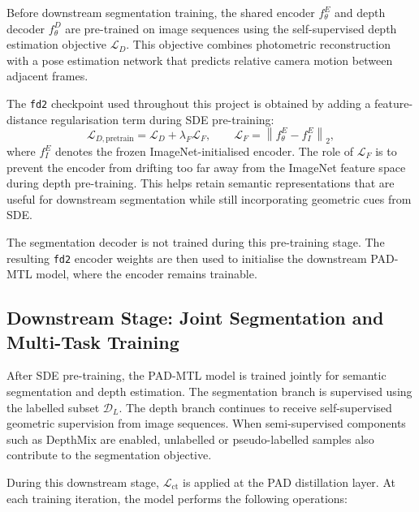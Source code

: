 Before downstream segmentation training, the shared encoder $f_\theta^E$
and depth decoder $f_\theta^D$ are pre-trained on image sequences using
the self-supervised depth estimation objective $\mathcal{L}_D$. This
objective combines photometric reconstruction with a pose estimation
network that predicts relative camera motion between adjacent frames.

The \texttt{fd2} checkpoint used throughout this project is obtained by
adding a feature-distance regularisation term during SDE pre-training:
\begin{equation}
    \mathcal{L}_{D,\text{pretrain}}
    =
    \mathcal{L}_D
    +
    \lambda_F \mathcal{L}_F,
    \qquad
    \mathcal{L}_F
    =
    \left\|
    f_\theta^E - f_I^E
    \right\|_2,
    \label{eq:pretrain-loss}
\end{equation}
where $f_I^E$ denotes the frozen ImageNet-initialised encoder. The role of
$\mathcal{L}_F$ is to prevent the encoder from drifting too far away from
the ImageNet feature space during depth pre-training. This helps retain
semantic representations that are useful for downstream segmentation while
still incorporating geometric cues from SDE.

The segmentation decoder is not trained during this pre-training stage.
The resulting \texttt{fd2} encoder weights are then used to initialise the
downstream PAD-MTL model, where the encoder remains trainable.

\subsection{Downstream Stage: Joint Segmentation and Multi-Task Training}
\label{sec:downstream-stage}

After SDE pre-training, the PAD-MTL model is trained jointly for semantic
segmentation and depth estimation. The segmentation branch is supervised
using the labelled subset $\mathcal{D}_L$. The depth branch continues to
receive self-supervised geometric supervision from image sequences.
When semi-supervised components such as DepthMix are enabled, unlabelled
or pseudo-labelled samples also contribute to the segmentation objective.

During this downstream stage, $\mathcal{L}_\text{ct}$ is applied at the
PAD distillation layer. At each training iteration, the model performs the
following operations:

